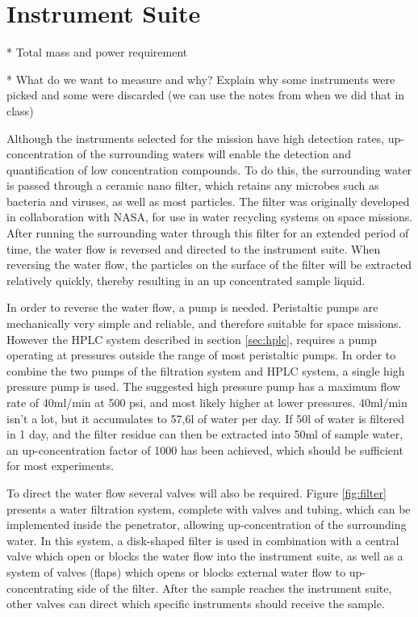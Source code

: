 \chapter{Instrument Suite}

* Total mass and power requirement

* What do we want to measure and why? Explain why some instruments were picked and some were discarded (we can use the notes from when we did that in class)


\label{sec:water_flow}

Although the instruments selected for the mission have high detection rates, up-concentration of the surrounding waters will enable the detection and quantification of low concentration compounds. To do this, the surrounding water is passed through a ceramic nano filter, which retains any microbes such as bacteria and viruses, as well as most particles. The filter was originally developed in collaboration with NASA, for use in water recycling systems on space missions. After running the surrounding water through this filter for an extended period of time, the water flow is reversed and directed to the instrument suite. When reversing the water flow, the particles on the surface of the filter will be extracted relatively quickly, thereby resulting in an up concentrated sample liquid.

In order to reverse the water flow, a pump is needed. Peristaltic pumps are mechanically very simple and reliable, and therefore suitable for space missions. However the HPLC system described in section \ref{sec:hplc}, requires a pump operating at pressures outside the range of most peristaltic pumps. In order to combine the two pumps of the filtration system and HPLC system, a single high pressure pump \cite{missing?} is used. The suggested high pressure pump has a maximum flow rate of 40ml/min at 500 psi, and most likely higher at lower pressures. 40ml/min isn't a lot, but it accumulates to 57,6l of water per day. If 50l of water is filtered in 1 day, and the filter residue can then be extracted into 50ml of sample water, an up-concentration factor of 1000 has been achieved, which should be sufficient for most experiments.

To direct the water flow several valves will also be required. Figure \ref{fig:filter} presents a water filtration system, complete with valves and tubing, which can be implemented inside the penetrator, allowing up-concentration of the surrounding water. In this system, a disk-shaped filter is used in combination with a central valve which open or blocks the water flow into the instrument suite, as well as a system of valves (flaps) which opens or blocks external water flow to up-concentrating side of the filter. After the sample reaches the instrument suite, other valves can direct which specific instruments should receive the sample.

